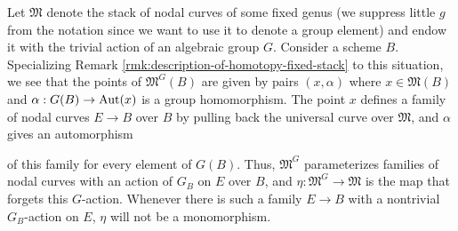 \begin{example}\label{rl-0008}
  Let \(\mathfrak M\) denote the stack of nodal curves of some fixed genus (we suppress little \(g\) from the notation since we want to use it to denote a group element) and endow it with the trivial action of an algebraic group \(G\). Consider a scheme \(B\). Specializing Remark \ref{rmk:description-of-homotopy-fixed-stack} to this situation, we see that the points of \(\mathfrak M^G(B)\) are given by pairs \((x,\alpha)\) where \(x\in \mathfrak M(B)\) and \(\alpha:G(B)\to \operatorname{Aut}(x)\) is a group homomorphism. The point \(x\) defines a family of nodal curves \(E\to B\) over \(B\) by pulling back the universal curve over \(\mathfrak M\), and \(\alpha\) gives an automorphism
  \begin{center}
  \end{center}
  of this family for every element of \(G(B)\). Thus, \(\mathfrak M^G\) parameterizes families of nodal curves with an action of \(G_B\) on \(E\) over \(B\), and \(\eta:\mathfrak M^G\to \mathfrak M\) is the map that forgets this \(G\)-action. Whenever there is such a family \(E\to B\) with a nontrivial \(G_B\)-action on \(E\), \(\eta\) will not be a monomorphism.
\end{example}
